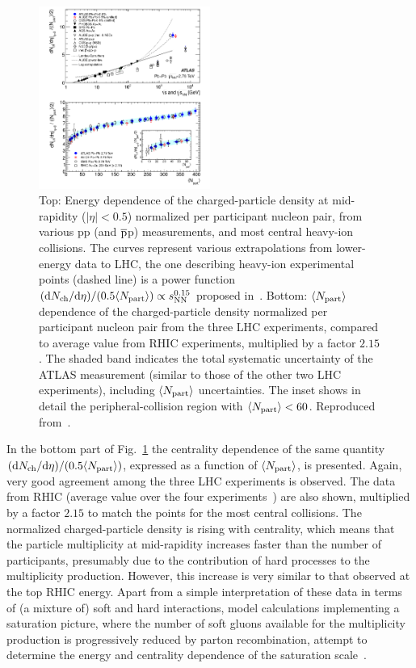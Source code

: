 \begin{figure}
\centering
\includegraphics[width=0.5\textwidth]{ksfigures/EnergCentMult.png}
\caption{Top: Energy dependence of the charged-particle density at mid-rapidity ($|\eta| < 0.5$) normalized per participant nucleon pair, from various pp (and $\overline{\rm p}$p) measurements, and most central heavy-ion collisions. The curves represent various extrapolations from lower-energy data to LHC, the one describing heavy-ion experimental points (dashed line) is a power function $({\rm d}N_{\rm ch}/{\rm d}\eta)/(0.5 \langle N_{\rm part} \rangle) \propto s_{\rm NN}^{0.15}$ proposed in~\cite{Aamodt:2010pb}. Bottom: $\langle N_{\rm part} \rangle$ dependence of the charged-particle density normalized per participant nucleon pair from the three LHC experiments, compared to average value from RHIC experiments, multiplied by a factor $2.15$. The shaded band indicates the total systematic uncertainty of the ATLAS measurement (similar to those of the other two LHC experiments),  including $\langle N_{\rm part} \rangle$ uncertainties. The inset shows in detail the peripheral-collision region with $\langle N_{\rm part} \rangle < 60$. Reproduced from~\cite{ATLAS:2011ag}.}
\label{figks:EnrgyMult}
\end{figure}

In the bottom part of Fig.~\ref{figks:EnrgyMult} the centrality dependence of the same quantity $({\rm d}N_{\rm ch}/{\rm d}\eta)/(0.5 \langle N_{\rm part} \rangle)$, expressed as a function of $\langle N_{\rm part} \rangle$, is presented. Again, very good agreement among the three LHC experiments is observed. The data from RHIC (average value over the four experiments~\cite{Adler:2004zn}) are also shown, multiplied by a factor $2.15$ to match the points for the most central collisions. The normalized charged-particle density is rising with centrality, which means that the particle multiplicity at mid-rapidity increases faster than the number of participants, presumably due to the contribution of hard processes to the multiplicity production. However, this increase is very similar to that observed at the top RHIC energy. Apart from a simple interpretation of these data in terms of (a mixture of) soft and hard interactions, model calculations implementing a saturation picture, where the number of soft gluons available for the multiplicity production is progressively reduced by parton recombination, attempt to determine the energy and centrality dependence of the saturation scale~\cite{Armesto:2004ud,Kharzeev:2004if,ALbacete:2010ad}.

